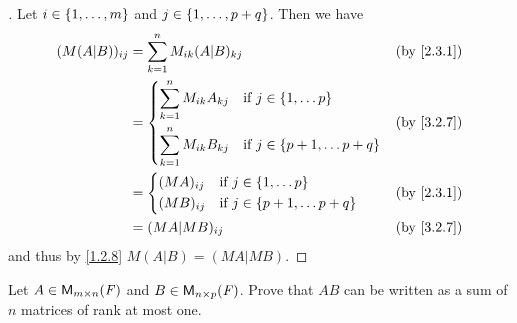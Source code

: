 \begin{proof}[]
  Let \(i \in \left\lbrace1, \dots, m\right\rbrace\) and \(j \in \left\lbrace1, \dots, p + q\right\rbrace\).
  Then we have
  \begin{align*}
    (M (A | B))_{i j} & = \sum_{k = 1}^n M_{i k} (A | B)_{k j}                                        &  & \text{(by \cref{2.3.1})} \\
                      & = \begin{dcases}
                            \sum_{k = 1}^n M_{i k} A_{k j} & \text{if } j \in \set{1, \dots p}         \\
                            \sum_{k = 1}^n M_{i k} B_{k j} & \text{if } j \in \set{p + 1, \dots p + q}
                          \end{dcases} &  & \text{(by \cref{3.2.7})}                                \\
                      & = \begin{dcases}
                            (MA)_{i j} & \text{if } j \in \set{1, \dots p}         \\
                            (MB)_{i j} & \text{if } j \in \set{p + 1, \dots p + q}
                          \end{dcases}                     &  & \text{(by \cref{2.3.1})}                                            \\
                      & = (MA | MB)_{i j}                                                             &  & \text{(by \cref{3.2.7})}
  \end{align*}
  and thus by \cref{1.2.8} \(M (A | B) = (MA | MB)\).
\end{proof}

\setcounter{ex}{17}
\begin{ex}\label{ex:3.2.18}
  Let \(A \in \mathsf{M}_{{m} \times n}({\mathit{F}})\) and \(B \in \mathsf{M}_{{n} \times p}({\mathit{F}})\).
  Prove that \(AB\) can be written as a sum of \(n\) matrices of rank at most one.
\end{ex}

